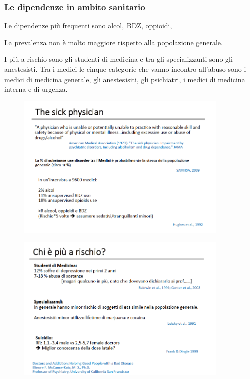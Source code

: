 \subsubsection{Le dipendenze in ambito sanitario}

Le dipendenze più frequenti sono alcol, BDZ, oppioidi,

La prevalenza non è molto maggiore rispetto alla popolazione generale.

I più a rischio sono gli studenti di medicina e tra gli specializzanti
sono gli anestesisti. Tra i medici le cinque categorie che vanno
incontro all'abuso sono i medici di medicina generale, gli anestesisiti,
gli psichiatri, i medici di medicina interna e di urgenza.

\begin{figure}[!ht]
\centering
	\includegraphics[width=0.9\textwidth]{017/image21.png}
\end{figure}

\begin{figure}[!ht]
\centering
	\includegraphics[width=0.9\textwidth]{017/image22.png}
\end{figure}

